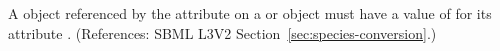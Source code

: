 A \Parameter object referenced by the attribute  on
a \Species or \Model object must have a value of  for its
attribute .  (References: SBML L3V2
Section~\ref{sec:species-conversion}.)
